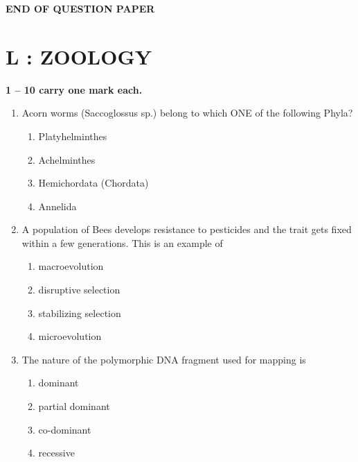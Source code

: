 \documentclass[journal,12pt,onecolumn]{IEEEtran}
\begin{document}
\begin{center}
\textbf{END OF QUESTION PAPER}
\end{center}
\newpage
\section*{\centering L : ZOOLOGY}

\noindent \textbf{ 1 -- 10 carry one mark each.}

\begin{enumerate}[label=\arabic*.]

\item Acorn worms (Saccoglossus sp.) belong to which ONE of the following Phyla?

\begin{multicols}{4}
\begin{enumerate}[label=(\Alph*)]
\item Platyhelminthes
\item Achelminthes
\item Hemichordata (Chordata)
\item Annelida
\end{enumerate}
\end{multicols}

\item A population of Bees develops resistance to pesticides and the trait gets fixed within a few generations. This is an example of

\begin{multicols}{4}
\begin{enumerate}[label=(\Alph*)]
\item macroevolution
\item disruptive selection
\item stabilizing selection
\item microevolution
\end{enumerate}
\end{multicols}

\item The nature of the polymorphic DNA fragment used for mapping is

\begin{multicols}{4}
\begin{enumerate}[label=(\Alph*)]
\item dominant
\item partial dominant
\item co-dominant
\item recessive
\end{enumerate}
\end{multicols}


\end{enumerate}
\end{document}
